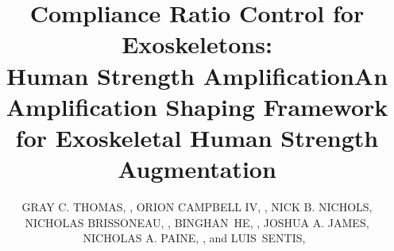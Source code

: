 \documentclass{ieeeaccess}
\begin{document}


\title{Compliance Ratio Control for Exoskeletons:\\Human Strength Amplification}

\title{An Amplification Shaping Framework for Exoskeletal Human Strength Augmentation}

%
%
%

\author{\uppercase{Gray C. Thomas}, ,
	\uppercase{Orion {Campbell IV}}, ,
	\uppercase{Nick B. Nichols},
	\uppercase{Nicholas Brissoneau}, ,
	\uppercase{Binghan~He}, ,
	\uppercase{Joshua A. James},
	\uppercase{Nicholas A. Paine}, ,
	and \uppercase{Luis~Sentis},~ }
\address[1]{Department of Electrical Engineering and Computer Science, University of Michigan, Ann Arbor, MI 48109 USA (e-mail: gcthomas@ieee.org)}
\address[2]{Apptronik, Inc., Austin, TX 78758 USA}
\address[3]{LinkDyn Robotics Inc., Austin, TX 78759 USA}
\address[4]{Walker Department of Mechanical Engineering, The University of Texas at Austin, Austin, TX 78712 USA (e-mail: binghan@utexas.edu)}
\address[5]{Aerospace Engineering and Engineering Mechanics, The University of Texas at Austin, Austin, TX 78712 USA (e-mail: lsentis@austin.utexas.edu)}
\end{document}
